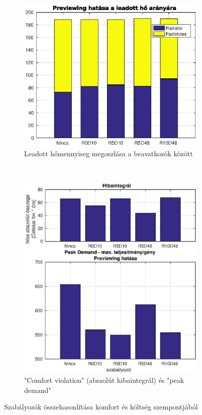 \begin{figure}[H]
	\begin{subfigure}[t]{0.48\textwidth}
		\centering
		\includegraphics[trim=0 -40 0 0, clip,width=1.1\textwidth]{figures/onlab/compare/A_compareEnergy}
		\caption{Leadott hőmennyiseg megoszlása a beavatkozók között}
		\label{fig:constrefHeat}
	\end{subfigure}
	~
	\begin{subfigure}[t]{0.48\textwidth}
		\centering
		\includegraphics[trim=0 0 0 0, clip,width=1.1\textwidth]{figures/onlab/compare/A_compareComfort}
		\caption{"Comfort violation" (abszolút hibaintegrál) és "peak demand"}
		\label{fig:mpc-PeakDemand}
	\end{subfigure}
	\label{fig:mpcComfortCost}
	\caption{Szabályozók összehasonlítása komfort és költség szempontjából}
\end{figure}


